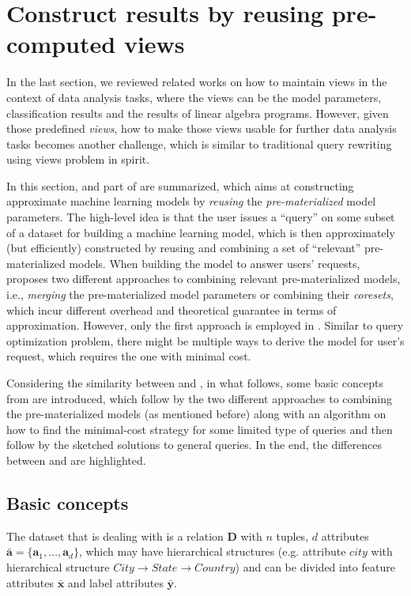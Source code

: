 \section{Construct results by reusing pre-computed views}\label{sec: view_reuse}
In the last section, we reviewed related works on how to maintain views in the context of data analysis tasks, where the views can be the model parameters, classification results and the results of linear algebra programs. However, given those predefined {\em views}, how to make those views usable for further data analysis tasks becomes another challenge, which is similar to traditional query rewriting using views problem \cite{halevy2001answering} in spirit.

In this section, \cite{hasani2018efficient} and part of \cite{gupta2015processing} are summarized, which aims at constructing approximate machine learning models by {\em reusing} the {\em pre-materialized} model parameters. The high-level idea is that the user issues a ``query'' on some subset of a dataset for building a machine learning model, which is then approximately (but efficiently) constructed by reusing and combining a set of ``relevant'' pre-materialized models. When building the model to answer users' requests, \cite{hasani2018efficient} proposes two different approaches to combining relevant pre-materialized models, i.e., {\em merging} the pre-materialized model parameters or combining their {\em coresets}, which incur different overhead and theoretical guarantee in terms of approximation.  However, only the first approach is employed in \cite{gupta2015processing}. Similar to query optimization problem, there might be multiple ways to derive the model for user's request, which requires the one with minimal cost.

Considering the similarity between \cite{hasani2018efficient} and \cite{gupta2015processing}, in what follows, some basic concepts from \cite{hasani2018efficient} are introduced, which follow by the two different approaches to combining the pre-materialized models (as mentioned before) along with an algorithm on how to find the minimal-cost strategy for some limited type of queries and then follow by the sketched solutions to general queries. In the end, the differences between \cite{hasani2018efficient} and \cite{gupta2015processing} are highlighted.


\subsection{Basic concepts}
The dataset that \cite{hasani2018efficient} is dealing with is a relation $\textbf{D}$ with $n$ tuples, $d$ attributes $\bar{\textbf{a}} = \{\textbf{a}_1, \dots, \textbf{a}_d\}$, which may have hierarchical structures (e.g. attribute $city$ with hierarchical structure $City \rightarrow State \rightarrow Country$) and can be divided into feature attributes $\bar{\textbf{x}}$ and label attributes $\bar{\textbf{y}}$.


